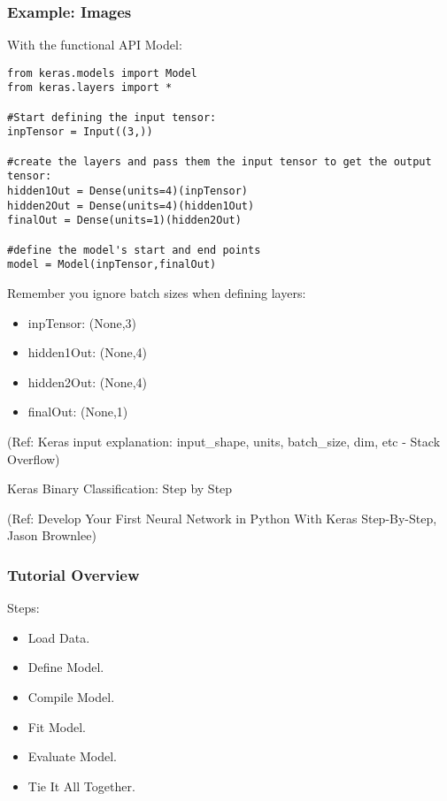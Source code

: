 \begin{frame}[fragile] \frametitle{Example: Images}

With the functional API Model:

\begin{lstlisting}
from keras.models import Model   
from keras.layers import * 

#Start defining the input tensor:
inpTensor = Input((3,))   

#create the layers and pass them the input tensor to get the output tensor:    
hidden1Out = Dense(units=4)(inpTensor)    
hidden2Out = Dense(units=4)(hidden1Out)    
finalOut = Dense(units=1)(hidden2Out)   

#define the model's start and end points    
model = Model(inpTensor,finalOut)  
\end{lstlisting}

Remember you ignore batch sizes when defining layers:

\begin{itemize}
\item  inpTensor: (None,3)
\item  hidden1Out: (None,4)
\item  hidden2Out: (None,4)
\item  finalOut: (None,1)
\end{itemize}


\tiny{(Ref: Keras input explanation: input\_shape, units, batch\_size, dim, etc - Stack Overflow)}
\end{frame}


\begin{frame}
  \begin{center}
    {\Large Keras Binary Classification: Step by Step}
    
    \tiny{(Ref:  Develop Your First Neural Network in Python With Keras Step-By-Step, Jason Brownlee)}
  \end{center}
\end{frame}

\begin{frame}[fragile] \frametitle{Tutorial Overview}
Steps:
\begin{itemize}
\item  Load Data.
\item  Define Model.
\item  Compile Model.
\item  Fit Model.
\item  Evaluate Model.
\item  Tie It All Together.

\end{itemize}
\end{frame}

